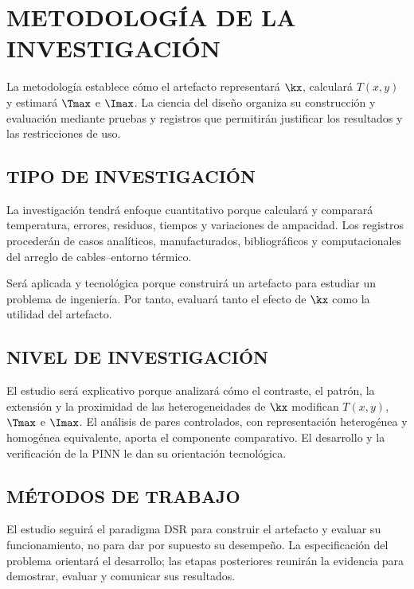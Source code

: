 \chapter{METODOLOGÍA DE LA INVESTIGACIÓN}
\label{ch:metodologia}
\thispagestyle{empty}

La metodología establece cómo el artefacto representará $\kx$, calculará $T(x,y)$ y estimará $\Tmax$ e $\Imax$. La ciencia del diseño organiza su construcción y evaluación mediante pruebas y registros que permitirán justificar los resultados y las restricciones de uso.

\section{TIPO DE INVESTIGACIÓN}
\label{sec:metodologia}

La investigación tendrá enfoque cuantitativo porque calculará y comparará temperatura, errores, residuos, tiempos y variaciones de ampacidad. Los registros procederán de casos analíticos, manufacturados, bibliográficos y computacionales del arreglo de cables--entorno térmico.

Será aplicada y tecnológica porque construirá un artefacto para estudiar un problema de ingeniería. Por tanto, evaluará tanto el efecto de $\kx$ como la utilidad del artefacto.

\section{NIVEL DE INVESTIGACIÓN}

El estudio será explicativo porque analizará cómo el contraste, el patrón, la extensión y la proximidad de las heterogeneidades de $\kx$ modifican $T(x,y)$, $\Tmax$ e $\Imax$. El análisis de pares controlados, con representación heterogénea y homogénea equivalente, aporta el componente comparativo. El desarrollo y la verificación de la PINN le dan su orientación tecnológica.

\section{MÉTODOS DE TRABAJO}

El estudio seguirá el paradigma DSR para construir el artefacto y evaluar su funcionamiento, no para dar por supuesto su desempeño. La especificación del problema orientará el desarrollo; las etapas posteriores reunirán la evidencia para demostrar, evaluar y comunicar sus resultados.

